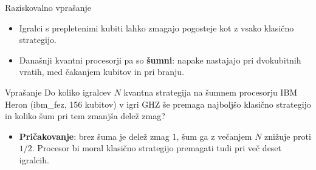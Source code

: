 \documentclass[aspectratio=169,11pt]{beamer}
\newcommand{\poudari}[1]{\textbf{\textcolor{oranzna}{#1}}}
\begin{document}
\begin{frame}{Raziskovalno vprašanje}
\begin{itemize}
\item Igralci s prepletenimi kubiti lahko zmagajo pogosteje kot z vsako klasično strategijo.
\item Današnji kvantni procesorji pa so \poudari{šumni}: napake nastajajo pri dvokubitnih vratih, med čakanjem kubitov
      in pri branju.
\end{itemize}
\medskip
\begin{block}{Vprašanje}
Do koliko igralcev $N$ kvantna strategija na šumnem procesorju IBM Heron (ibm\_fez, 156 kubitov) v igri GHZ še premaga
najboljšo klasično strategijo in koliko šum pri tem zmanjša delež zmag?
\end{block}
\medskip
\begin{itemize}
\item \textbf{Pričakovanje}: brez šuma je delež zmag 1, šum ga z večanjem $N$ znižuje proti $1/2$. Procesor bi moral
      klasično strategijo premagati tudi pri več deset igralcih.
\end{itemize}
\end{frame}
\end{document}
